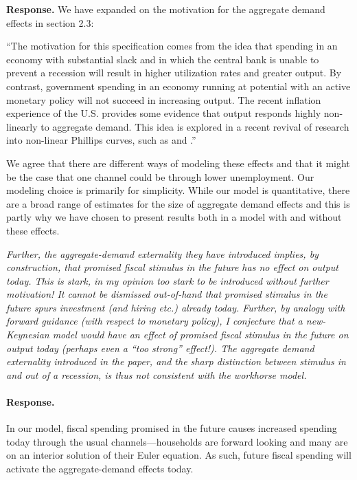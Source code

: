 \documentclass[12pt,letterpaper,english]{article}
\begin{document}
\begin{enumerate}
	\noindent \textbf{Response.} We have expanded on the motivation for the aggregate demand effects in section 2.3:
	
	``The motivation for this specification comes from the idea that spending in an economy with substantial slack and in which the central bank is unable to prevent a recession will result in higher utilization rates and greater output. By contrast, government spending in an economy running at potential with an active monetary policy will not succeed in increasing output. The recent inflation experience of the U.S. provides some evidence that output responds highly non-linearly to aggregate demand. This idea is explored in a recent revival of research into non-linear Phillips curves, such as \cite{benigno2023baaack} and \cite{blanco2024nonlinear}.''
	
	We agree that there are different ways of modeling these effects and that it might be the case that one channel could be through lower unemployment. Our modeling choice is primarily for simplicity. While our model is quantitative, there are a broad range of estimates for the size of aggregate demand effects and this is partly why we have chosen to present results both in a model with and without these effects. 
	
	\textit{Further, the aggregate-demand externality they have introduced implies,	by construction, that promised fiscal stimulus in the future has no effect on output today. This is stark, in my opinion too stark to be introduced without further motivation! It cannot be dismissed out-of-hand that promised stimulus in the future spurs investment (and hiring etc.) already today. Further, by analogy with forward guidance (with respect to monetary policy), I conjecture that a new-Keynesian model would have an effect of promised fiscal stimulus in the future on output today (perhaps even a ``too strong'' effect!). The aggregate demand externality introduced in the paper, and the sharp distinction	between stimulus in and out of a recession, is thus not consistent with	the workhorse model.}
	
	\paragraph{Response.} In our model, fiscal spending promised in the future causes increased spending today through the usual channels---households are forward looking and many are on an interior solution of their Euler equation. As such, future fiscal spending will activate the aggregate-demand effects today.
	

\end{enumerate}
\end{document}
